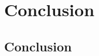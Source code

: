 \documentclass[a4paper,twoside,openright]{book}
\theoremstyle{plain}
\theoremstyle{definition}
\begin{document}
\part*{Conclusion}
\label{part:conc}
\chapter{Conclusion}
\label{chap:concl}


\listoffigures
\listoftables




\appendix











\end{document}
